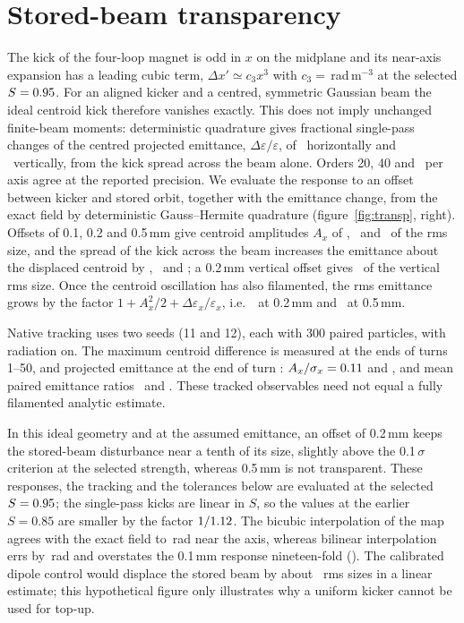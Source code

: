 \documentclass[aps,prab,reprint,amsmath,amssymb,floatfix,longbibliography]{revtex4-2}
\begin{document}
\section{Stored-beam transparency}
\label{sec:transparency}

The kick of the four-loop magnet is odd in $x$ on the midplane and its near-axis expansion has a leading cubic term, $\Delta x'\simeq c_3x^3$ with $c_3={}$\CubicCoeff\,rad\,m$^{-3}$ at the selected $S=0.95$. For an aligned kicker and a centred, symmetric Gaussian beam the ideal centroid kick therefore vanishes exactly. This does not imply unchanged finite-beam moments: deterministic quadrature gives fractional single-pass changes of the centred projected emittance, $\Delta\varepsilon/\varepsilon$, of \AlignedMomentX\ horizontally and \AlignedMomentY\ vertically, from the kick spread across the beam alone. Orders 20, 40 and \MomentGHOrder\ per axis agree at the reported precision. We evaluate the response to an offset between kicker and stored orbit, together with the emittance change, from the exact field by deterministic Gauss--Hermite quadrature (figure~\ref{fig:transp}, right). Offsets of 0.1, 0.2 and 0.5\,mm give centroid amplitudes $A_x$ of \TranspOneAmp, \TranspTwoAmp\ and \TranspFiveAmp\ of the rms size, and the spread of the kick across the beam increases the emittance about the displaced centroid by \TranspOneEmit, \TranspTwoEmit\ and \TranspFiveEmit; a 0.2\,mm vertical offset gives \TranspVertTwoAmp\ of the vertical rms size. Once the centroid oscillation has also filamented, the rms emittance grows by the factor $1+A_x^2/2+\Delta\varepsilon_x/\varepsilon_x$, i.e.\ \TranspTwoTotal\ at 0.2\,mm and \TranspFiveTotal\ at 0.5\,mm.

Native tracking uses two seeds (11 and 12), each with 300 paired particles, with radiation on. The maximum centroid difference is measured at the ends of turns 1--50, and projected emittance at the end of turn \TrackedTurns: $A_x/\sigma_x=0.11$ and \TrackedFiveAmp, and mean paired emittance ratios \TrackedTwoEmitRatio\ and \TrackedFiveEmitRatio. These tracked observables need not equal a fully filamented analytic estimate.

In this ideal geometry and at the assumed emittance, an offset of 0.2\,mm keeps the stored-beam disturbance near a tenth of its size, slightly above the 0.1\,$\sigma$ criterion at the selected strength, whereas 0.5\,mm is not transparent. These responses, the tracking and the tolerances below are evaluated at the selected $S=0.95$; the single-pass kicks are linear in $S$, so the values at the earlier $S=0.85$ are smaller by the factor $1/1.12$. The bicubic interpolation of the map agrees with the exact field to \BicubicErr\,rad near the axis, whereas bilinear interpolation errs by \BilinearErr\,rad and overstates the 0.1\,mm response nineteen-fold (\TranspBilinOne). The calibrated dipole control would displace the stored beam by about \CtrlDipoleAmp\ rms sizes in a linear estimate; this hypothetical figure only illustrates why a uniform kicker cannot be used for top-up.
\end{document}
